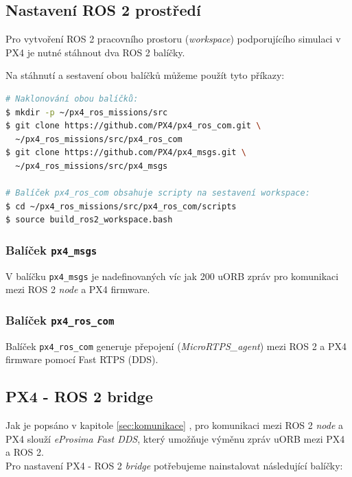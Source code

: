 \subsection{Nastavení ROS 2 prostředí}

Pro vytvoření ROS 2 pracovního prostoru (\textit{workspace}) podporujícího simulaci v PX4 je nutné stáhnout dva ROS 2 balíčky. \cite{PX4docs}

Na stáhnutí a sestavení obou balíčků můžeme použít tyto příkazy:

\begin{lstlisting}[language=bash]
# Naklonování obou balíčků:
$ mkdir -p ~/px4_ros_missions/src
$ git clone https://github.com/PX4/px4_ros_com.git \
  ~/px4_ros_missions/src/px4_ros_com
$ git clone https://github.com/PX4/px4_msgs.git \
  ~/px4_ros_missions/src/px4_msgs
  
# Balíček px4_ros_com obsahuje scripty na sestavení workspace:
$ cd ~/px4_ros_missions/src/px4_ros_com/scripts
$ source build_ros2_workspace.bash
\end{lstlisting}

\subsubsection{Balíček \texttt{px4\_msgs}}

V balíčku \texttt{px4\_msgs} je nadefinovaných víc jak 200 uORB zpráv pro komunikaci mezi ROS 2 \textit{node} a PX4 firmware.

\subsubsection{Balíček \texttt{px4\_ros\_com}}

Balíček \texttt{px4\_ros\_com} generuje přepojení (\textit{MicroRTPS\_agent}) mezi ROS 2 a PX4 firmware pomocí Fast RTPS (\acs{DDS}).

\subsection{PX4 - ROS 2 bridge}

Jak je popsáno v kapitole \ref{sec:komunikace} , pro komunikaci mezi ROS 2 \textit{node} a PX4 slouží \textit{eProsima Fast DDS}, který umožňuje výměnu zpráv uORB mezi PX4 a ROS 2.\\

Pro nastavení PX4 - ROS 2 \textit{bridge} potřebujeme nainstalovat následující balíčky:

